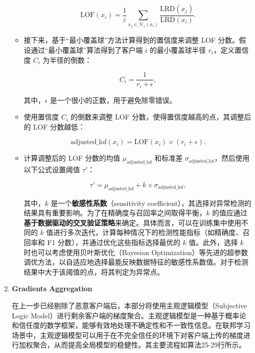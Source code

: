 \documentclass[lettersize,journal]{IEEEtran}
\begin{document}
\begin{enumerate}
\begin{itemize}
    \begin{equation}
    \text{LOF}(x_i) = \frac{1}{\varepsilon} \sum_{x_j \in \mathcal{N}_\varepsilon(x_i)} \frac{\text{LRD}(x_j)}{\text{LRD}(x_i)}.
    \end{equation}

    \item 接下来，基于“最小覆盖球”方法计算得到的置信度来调整 LOF 分数。假设通过“最小覆盖球”算法得到了客户端 \(i\) 的最小覆盖球半径 \(r_i\)，定义置信度 \(C_i\) 为半径的倒数：

    \begin{equation}
    C_i = \frac{1}{r_i + \epsilon},
    \end{equation}

    其中，\(\epsilon\) 是一个很小的正数，用于避免除零错误。

    \item 使用置信度 \(C_i\) 的倒数来调整 LOF 分数，使得置信度越高的点，其调整后的 LOF 分数越低：

    \begin{equation}
    \text{adjusted\_lof}(x_i) = \text{LOF}(x_i) \times (r_i + \epsilon).
    \end{equation}

    \item 计算调整后的 LOF 分数的均值 \(\mu_{\text{adjusted\_lof}}\) 和标准差 \(\sigma_{\text{adjusted\_lof}}\)，然后使用以下公式设置阈值 \(\tau'\)：

    \begin{equation}
    \tau' = \mu_{\text{adjusted\_lof}} + k \times \sigma_{\text{adjusted\_lof}},
    \end{equation}

    其中，\(k\) 是一个\textbf{敏感性系数}（sensitivity coefficient），其选择对异常检测的结果具有重要影响。为了在精确度与召回率之间取得平衡，\(k\) 的值应通过\textbf{基于数据驱动的交叉验证策略}来确定。具体而言，可以在训练集中使用不同的 \(k\) 值进行多次迭代，计算每种情况下的检测性能指标（如精确度、召回率和 F1 分数），并通过优化这些指标选择最优的 \(k\) 值。此外，选择 \(k\) 时也可以考虑使用贝叶斯优化（Bayesian Optimization）等先进的超参数调优方法，以自适应地选择最能反映数据特征的敏感性系数值。对于检测结果中大于该阈值的点，将其判定为异常点。
\end{itemize}


\item \textbf{Gradients Aggregation}

在上一步已经剔除了恶意客户端后，本部分将使用主观逻辑模型（Subjective Logic Model）进行剩余客户端的梯度聚合。主观逻辑模型是一种基于概率论和信任度的数学框架，能够有效地处理不确定性和不一致性信息。在联邦学习场景中，主观逻辑模型可以用于在不完全信任的环境下对客户端上传的梯度进行加权聚合，从而提高全局模型的稳健性。其主要流程如算法25-29行所示。


\end{enumerate}
\end{document}
